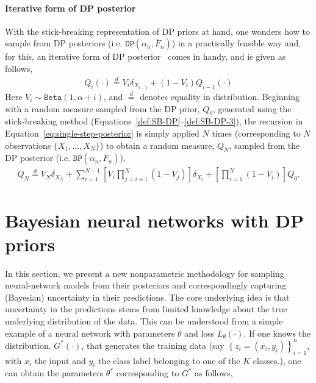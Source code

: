 \documentclass[10pt]{article}
\newcommand{\DP}{\texttt{DP}}
\begin{document}
\paragraph{Iterative form of DP posterior} With the stick-breaking representation of DP priors at hand, one wonders how to sample from DP posteriors (i.e. $\DP(\alpha_{n},\overline{F}_n)$) in a practically feasible way and, for this, an iterative form of DP posterior~\citep{blackwell1973ferguson,sethuraman1994constructive} comes in handy, and is given as follows,
\begin{align}\label{eq:single-step-posterior}
Q_{i}(\cdot) \stackrel{d}{=} V_{i}\delta_{X_{i-1}} + (1-V_{i})Q_{i-1}(\cdot)
\end{align}
Here $V_{i} \sim \texttt{Beta}(1,\alpha + i)$, and $\stackrel{d}{=}$ denotes equality in distribution. Beginning with a random measure sampled from the DP prior, $Q_{0}$, generated using the stick-breaking method (Equations~\ref{def:SB-DP}--\ref{def:SB-DP-3}),
the recursion in Equation~\ref{eq:single-step-posterior} is simply applied $N$ times (corresponding to $N$ observations $\{X_{1},. . ., X_{N}\}$) to obtain a random measure, $Q_{N}$, sampled from the DP posterior (i.e. $\DP(\alpha_{n},\overline{F}_n)$), 
\begin{align}
\label{eq:multi-step-posterior}
Q_{N} \stackrel{d}{=} V_{N}\delta_{X_{N}} + \sum_{i=1}^{N-1}\left[V_{i}\prod_{j=i+1}^{N}(1-V_{j})\right]\delta_{X_{i}}  + \left[\prod_{i=1}^{N}(1-V_{i})\right] Q_{0}.
\end{align}


\section{Bayesian neural networks with DP priors}
\label{sec:DP-BNNs}

In this section, we present a new nonparametric methodology for sampling neural-network models from their posteriors and correspondingly capturing  (Bayesian) uncertainty in their predictions. The core underlying idea is that  uncertainty in the predictions stems from limited knowledge about the true underlying distribution of the data.  This can be understood from a simple example of a neural network with parameters $\theta$ and loss $L_{\theta}(\cdot)$.  If one knows the distribution. $G^{*}(\cdot)$, that generates the training data (say $\left\{z_{i}=\right. \left.\left(x_{i}, y_{i}\right)\right\}_{i=1}^{n}$, with $x_{i}$ the input and $y_{i}$ the class label belonging to one of the $K$ classes.), one can obtain the parameters $\theta^{*}$ corresponding to $G^{*}$ as follows,
\end{document}
